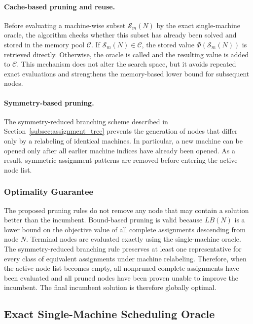 \documentclass[letterpaper, 10 pt, conference]{ieeeconf}  %
\begin{document}
\paragraph*{Cache-based pruning and reuse.}
Before evaluating a machine-wise subset $\mathcal{S}_m(N)$ by the exact
single-machine oracle, the algorithm checks whether this subset has already
been solved and stored in the memory pool $\mathcal{C}$. If
$\mathcal{S}_m(N)\in\mathcal{C}$, the stored value
$\Phi(\mathcal{S}_m(N))$ is retrieved directly. Otherwise, the oracle is
called and the resulting value is added to $\mathcal{C}$. This mechanism
does not alter the search space, but it avoids repeated exact evaluations
and strengthens the memory-based lower bound for subsequent nodes.

\paragraph*{Symmetry-based pruning.}
The symmetry-reduced branching scheme described in
Section~\ref{subsec:assignment_tree} prevents the generation of nodes that
differ only by a relabeling of identical machines. In particular, a new
machine can be opened only after all earlier machine indices have already
been opened. As a result, symmetric assignment patterns are removed before
entering the active node list.

\subsubsection{Optimality Guarantee}

The proposed pruning rules do not remove any node that may contain a
solution better than the incumbent. Bound-based pruning is valid because
$LB(N)$ is a lower bound on the objective value of all complete assignments
descending from node $N$. Terminal nodes are evaluated exactly using the
single-machine oracle. The symmetry-reduced branching rule preserves at
least one representative for every class of equivalent assignments under
machine relabeling. Therefore, when the active node list becomes empty, all
nonpruned complete assignments have been evaluated and all pruned nodes have
been proven unable to improve the incumbent. The final incumbent solution is
therefore globally optimal.


\subsection{Exact Single-Machine Scheduling Oracle}
\label{subsec:single_machine_oracle}
\end{document}
